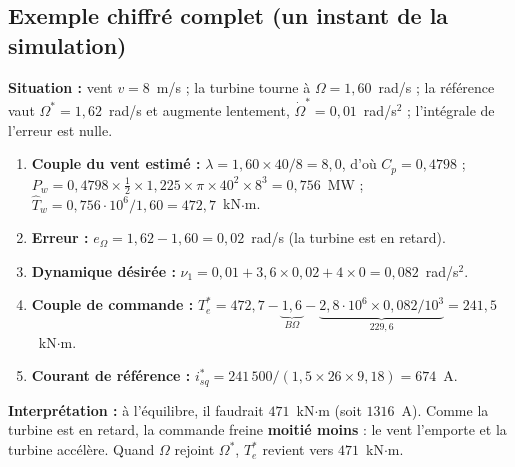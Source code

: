 \documentclass[11pt,a4paper]{article}
\begin{document}
\subsection{Exemple chiffré complet (un instant de la simulation)}
\begin{exemple}
\textbf{Situation :} vent $v = 8$~m/s ; la turbine tourne à $\Omega = 1{,}60$~rad/s ; la référence vaut
$\Omega^* = 1{,}62$~rad/s et augmente lentement, $\dot\Omega^* = 0{,}01$~rad/s$^2$ ; l'intégrale de l'erreur est nulle.
\begin{enumerate}
\item \textbf{Couple du vent estimé :}
      $\lambda = 1{,}60\times40/8 = 8{,}0$, d'où $C_p = 0{,}4798$ ;
      $P_w = 0{,}4798\times\tfrac12\times1{,}225\times\pi\times40^2\times8^3 = 0{,}756$~MW ;
      $\hat T_w = 0{,}756\cdot10^6/1{,}60 = 472{,}7$~kN$\cdot$m.
\item \textbf{Erreur :} $e_\Omega = 1{,}62 - 1{,}60 = 0{,}02$~rad/s (la turbine est en retard).
\item \textbf{Dynamique désirée :} $\nu_1 = 0{,}01 + 3{,}6\times0{,}02 + 4\times0 = 0{,}082$~rad/s$^2$.
\item \textbf{Couple de commande :}
      $T_e^* = 472{,}7 - \underbrace{1{,}6}_{B\Omega} - \underbrace{2{,}8\cdot10^6\times0{,}082/10^3}_{229{,}6} = 241{,}5$~kN$\cdot$m.
\item \textbf{Courant de référence :} $i_{sq}^* = 241\,500/(1{,}5\times26\times9{,}18) = 674$~A.
\end{enumerate}
\textbf{Interprétation :} à l'équilibre, il faudrait $471$~kN$\cdot$m (soit $1316$~A). Comme la turbine est en
retard, la commande freine \textbf{moitié moins} : le vent l'emporte et la turbine accélère. Quand
$\Omega$ rejoint $\Omega^*$, $T_e^*$ revient vers $471$~kN$\cdot$m.
\end{exemple}
\end{document}
